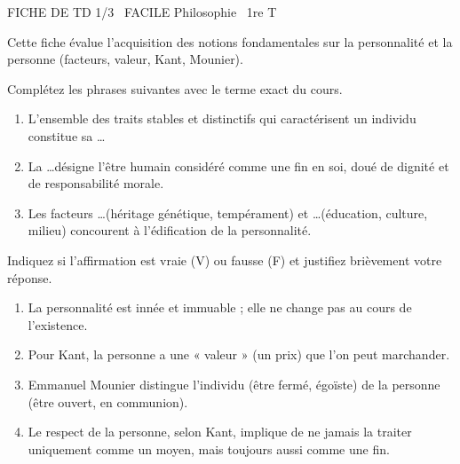 \documentclass[11pt]{article}
\begin{document}
\begin{tcolorbox}[enhanced,colback=popink,colframe=popink,arc=10pt,boxrule=0pt,left=12pt,right=12pt,top=9pt,bottom=9pt]
{\color{white}\popxbold\small FICHE DE TD 1/3 \textbullet\ FACILE \hfill Philosophie \textbullet\ 1re T\par}
\end{tcolorbox}
\vspace{4pt}
Cette fiche évalue l'acquisition des notions fondamentales sur la personnalité et la personne (facteurs, valeur, Kant, Mounier).

\begin{exercice}
Complétez les phrases suivantes avec le terme exact du cours.
\begin{enumerate}
    \item L'ensemble des traits stables et distinctifs qui caractérisent un individu constitue sa \ldots
    \item La \ldots désigne l'être humain considéré comme une fin en soi, doué de dignité et de responsabilité morale.
    \item Les facteurs \ldots (héritage génétique, tempérament) et \ldots (éducation, culture, milieu) concourent à l'édification de la personnalité.
\end{enumerate}
\end{exercice}

\begin{exercice}
Indiquez si l'affirmation est vraie (V) ou fausse (F) et justifiez brièvement votre réponse.
\begin{enumerate}
    \item La personnalité est innée et immuable ; elle ne change pas au cours de l'existence.
    \item Pour Kant, la personne a une « valeur » (un prix) que l'on peut marchander.
    \item Emmanuel Mounier distingue l'individu (être fermé, égoïste) de la personne (être ouvert, en communion).
    \item Le respect de la personne, selon Kant, implique de ne jamais la traiter uniquement comme un moyen, mais toujours aussi comme une fin.
\end{enumerate}
\end{exercice}
\end{document}
